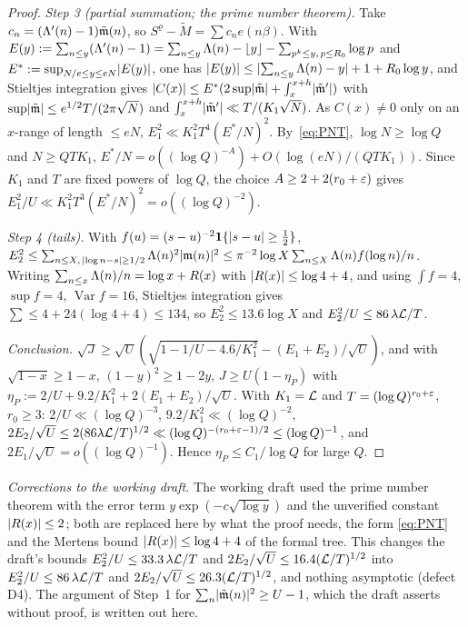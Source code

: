 \begin{proof}
\emph{Step 3 (partial summation; the prime number theorem).} Take $c_n=(\Lambda'(n)-1)\tilde{\mathfrak m}(n)$, so $S^\varrho-\tilde M=\sum c_ne(n\beta)$.
With $E(y):=\sum_{n\le y}(\Lambda'(n)-1)=\sum_{n\le y}\Lambda(n)-\lfloor y\rfloor-\sum_{p^k\le y,\,p\le R_0}\log p$ and $E^*:=\sup_{N/e\le y\le eN}\lvert E(y)\rvert$, one has
$\lvert E(y)\rvert\le\lvert \sum_{n\le y}\Lambda(n)-y\rvert+1+R_0\log y$, and Stieltjes integration gives $\lvert C(x)\rvert\le E^*(2\sup\lvert \tilde{\mathfrak m}\rvert+\int_x^{x+h}\lvert \tilde{\mathfrak m}'\rvert)$
with $\sup\lvert \tilde{\mathfrak m}\rvert\le e^{1/2}T/(2\pi\sqrt N)$ and $\int_x^{x+h}\lvert \tilde{\mathfrak m}'\rvert\ll T/(K_1\sqrt N)$. As $C(x)\ne0$ only on an $x$-range of length
$\le eN$, $E_1^2\ll K_1^2T^4(E^*/N)^2$. By~\eqref{eq:PNT}, $\log N\ge\log Q$ and $N\ge QTK_1$, $E^*/N=o((\log Q)^{-A})+O(\log(eN)/(QTK_1))$.
Since $K_1$ and $T$ are fixed powers of $\log Q$, the choice $A\ge2+2(r_0+\varepsilon)$ gives $E_1^2/U\ll K_1^2T^3(E^*/N)^2=o((\log Q)^{-2})$.

\emph{Step 4 (tails).} With $f(u)=(s-u)^{-2}\mathbf 1\{\lvert s-u\rvert\ge\frac12\}$,
$E_2^2\le\sum_{n\le X,\,\lvert \log n-s\rvert\ge1/2}\Lambda(n)^2\lvert \mathfrak m(n)\rvert^2\le\pi^{-2}\log X\sum_{n\le X}\Lambda(n)f(\log n)/n$. Writing
$\sum_{n\le x}\Lambda(n)/n=\log x+R(x)$ with $\lvert R(x)\rvert\le\log4+4$, and using $\int f=4$, $\sup f=4$, $\operatorname{Var}f=16$, Stieltjes integration gives
$\sum\le4+24(\log4+4)\le134$, so $E_2^2\le13.6\log X$ and $E_2^2/U\le86\,\lambda\mathcal L/T$.

\emph{Conclusion.} $\sqrt J\ge\sqrt U(\sqrt{1-1/U-4.6/K_1^2}-(E_1+E_2)/\sqrt U)$, and with $\sqrt{1-x}\ge1-x$, $(1-y)^2\ge1-2y$,
$J\ge U(1-\eta_P)$ with $\eta_P:=2/U+9.2/K_1^2+2(E_1+E_2)/\sqrt U$. With $K_1=\mathcal L$ and $T=(\log Q)^{r_0+\varepsilon}$, $r_0\ge3$:
$2/U\ll(\log Q)^{-3}$, $9.2/K_1^2\ll(\log Q)^{-2}$, $2E_2/\sqrt U\le2(86\lambda\mathcal L/T)^{1/2}\ll(\log Q)^{-(r_0+\varepsilon-1)/2}\le(\log Q)^{-1}$, and
$2E_1/\sqrt U=o((\log Q)^{-1})$. Hence $\eta_P\le C_1/\log Q$ for large $Q$.
\end{proof}

\emph{Corrections to the working draft.} The working draft used the prime number theorem with the error term
$y\exp(-c\sqrt{\log y})$ and the unverified constant $\lvert R(x)\rvert\le2$; both are replaced here by what the proof needs, the form
\eqref{eq:PNT} and the Mertens bound $\lvert R(x)\rvert\le\log4+4$ of the formal tree. This changes the draft's bounds $E_2^2/U\le33.3\,\lambda\mathcal L/T$ and $2E_2/\sqrt U\le16.4(\mathcal L/T)^{1/2}$ into $E_2^2/U\le86\,\lambda\mathcal L/T$ and
$2E_2/\sqrt U\le26.3(\mathcal L/T)^{1/2}$, and nothing asymptotic (defect D4). The argument of Step~1 for $\sum_n\lvert \tilde{\mathfrak m}(n)\rvert^2\ge U-1$, which the draft
asserts without proof, is written out here.

